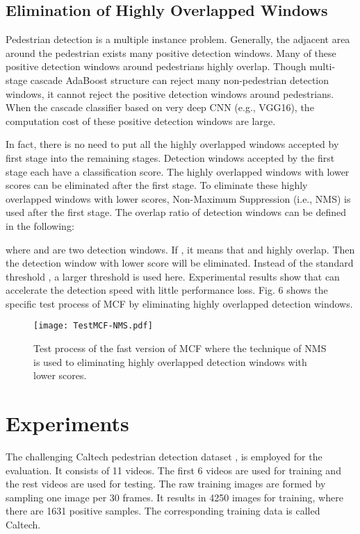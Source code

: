 \documentclass[journal]{IEEEtran}
\begin{document}
\subsection{Elimination of Highly Overlapped Windows}
Pedestrian detection is a multiple instance problem. Generally, the adjacent area around the pedestrian exists many positive detection windows. Many of these positive detection windows around pedestrians highly overlap. Though multi-stage cascade AdaBoost structure can reject many non-pedestrian detection windows, it cannot reject the positive detection windows around pedestrians. When the cascade classifier based on very deep CNN (e.g., VGG16), the computation cost of these positive detection windows are large.

In fact, there is no need to put all the highly overlapped windows accepted by first stage into the remaining stages. Detection windows accepted by the first stage each have a classification score. The highly overlapped windows with lower scores can be eliminated after the first stage. To eliminate these highly overlapped windows with lower scores, Non-Maximum Suppression (i.e., NMS) is used after the first stage. The overlap ratio  of detection windows can be defined in the following:

where  and   are two detection windows. If , it means that  and  highly overlap. Then the detection window with lower score will be eliminated. Instead of the standard threshold , a larger threshold is used here. Experimental results show that  can accelerate the detection speed with little performance loss. Fig. 6 shows the specific test process of MCF by eliminating highly overlapped detection windows.


\begin{figure}[!t]
\label{MCF-NMS}
\centering
\texttt{[image: TestMCF-NMS.pdf]}
\caption{Test process of the fast version of MCF where the technique of NMS is used to eliminating highly overlapped detection windows with lower scores.
} 
\end{figure}

\section{Experiments}
The challenging Caltech pedestrian detection dataset \cite{Dollar_PD_CVPR_2009}, \cite{Dollar_PD_PAMI_2010} is employed for the evaluation. It consists of 11 videos. The first 6 videos are used for training and the rest videos are used for testing. The raw training images are formed by sampling one image per 30 frames. It results in 4250 images for training, where there are 1631 positive samples. The corresponding training data is called Caltech.
\end{document}
